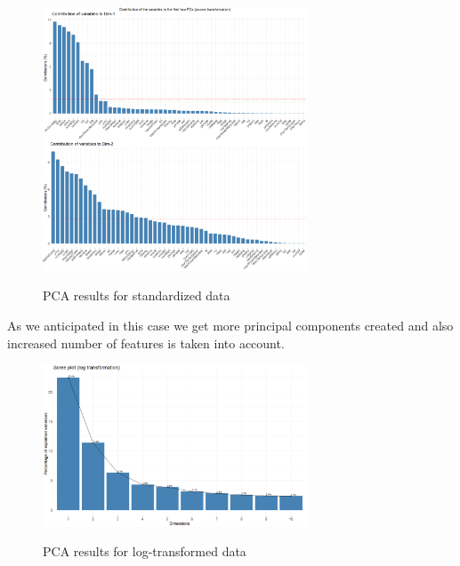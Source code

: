 \documentclass{article}
\begin{document}
	\begin{figure}[h]
		\caption{PCA results for standardized data}
		\centering
		\includegraphics[width=0.7\textwidth]{"proj2_plots/varplot2.png"}
		\label{fig::varplot_zscore}
	\end{figure}
	
	As we anticipated in this case we get more principal components created and also increased number of features is taken into account.
	
	\begin{figure}[h]
		\caption{PCA results for log-transformed data}
		\centering
		\includegraphics[width=0.7\textwidth]{"proj2_plots/screeplot3.png"}
		\label{fig::screeplot_log}
	\end{figure}
	
\end{document}
